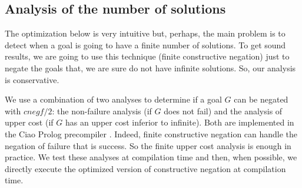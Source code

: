 \documentclass{llncs}
\newcommand{\entails}{\models}
\begin{document}




\subsection{Analysis of the number of solutions}
\label{cneg:finite_analysis}

The optimization below is very intuitive but, perhaps, the main
problem is to detect when a goal is going to have a finite number of
solutions. To get sound results, we are going to use this technique
(finite constructive negation) just to negate the goals that, we are
sure do not have infinite solutions. So, our analysis is conservative.

We use a combination of two analyses to determine if a goal $G$ can be negated with $cnegf/2$: the non-failure analysis
 (if $G$ does not fail) %
and the analysis of upper cost \cite{Lopez2} (if $G$ has an upper cost inferior to infinite). Both are
implemented in the Ciao Prolog precompiler
\cite{ciaopp-iclp99-tut}. Indeed, finite constructive negation can handle the
negation of failure that is success. So the finite upper cost analysis
is enough in practice. We test these analyses at compilation time
and then, when possible, we directly execute the optimized version
of constructive negation at compilation time.

\end{document}
